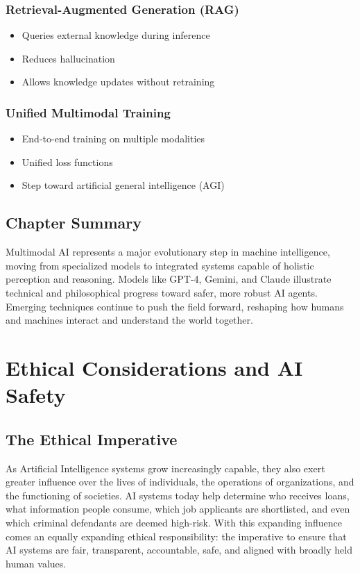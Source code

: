\documentclass[openany]{book}
\begin{document}
\subsection{Retrieval-Augmented Generation (RAG)}
\begin{itemize}
    \item Queries external knowledge during inference
    \item Reduces hallucination
    \item Allows knowledge updates without retraining
\end{itemize}

\subsection{Unified Multimodal Training}
\begin{itemize}
    \item End-to-end training on multiple modalities
    \item Unified loss functions
    \item Step toward artificial general intelligence (AGI)
\end{itemize}

\section{Chapter Summary}

Multimodal AI represents a major evolutionary step in machine intelligence, 
moving from specialized models to integrated systems capable of holistic 
perception and reasoning. Models like GPT-4, Gemini, and Claude illustrate 
technical and philosophical progress toward safer, more robust AI agents. 
Emerging techniques continue to push the field forward, reshaping how humans 
and machines interact and understand the world together.


\chapter{Ethical Considerations and AI Safety}

\section{The Ethical Imperative}

As Artificial Intelligence systems grow increasingly capable, they also exert 
greater influence over the lives of individuals, the operations of 
organizations, and the functioning of societies. AI systems today help 
determine who receives loans, what information people consume, which job 
applicants are shortlisted, and even which criminal defendants are deemed 
high-risk. With this expanding influence comes an equally expanding ethical 
responsibility: the imperative to ensure that AI systems are fair, transparent, 
accountable, safe, and aligned with broadly held human values.
\end{document}
